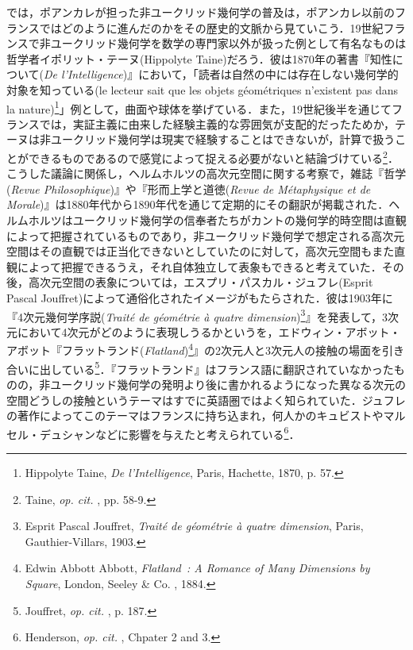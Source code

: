 では，ポアンカレが担った非ユークリッド幾何学の普及は，ポアンカレ以前のフランスではどのように進んだのかをその歴史的文脈から見ていこう．19世紀フランスで非ユークリッド幾何学を数学の専門家以外が扱った例として有名なものは哲学者イポリット・テーヌ(Hippolyte Taine)だろう．彼は1870年の著書『知性について(\emph{De l'Intelligence})』において，「読者は自然の中には存在しない幾何学的対象を知っている(le lecteur sait que les objets géométriques n'existent pas dans la nature)\footnote{Hippolyte Taine, \emph{De l'Intelligence}, Paris, Hachette, 1870, p. 57.}」例として，曲面や球体を挙げている．また，19世紀後半を通じてフランスでは，実証主義に由来した経験主義的な雰囲気が支配的だったためか，テーヌは非ユークリッド幾何学は現実で経験することはできないが，計算で扱うことができるものであるので感覚によって捉える必要がないと結論づけている\footnote{Taine, \emph{op. cit. }, pp. 58-9.}．こうした議論に関係し，ヘルムホルツの高次元空間に関する考察で，雑誌『哲学(\emph{Revue Philosophique})』や『形而上学と道徳(\emph{Revue  de Métaphysique et de Morale})』は1880年代から1890年代を通じて定期的にその翻訳が掲載された．ヘルムホルツはユークリッド幾何学の信奉者たちがカントの幾何学的時空間は直観によって把握されているものであり，非ユークリッド幾何学で想定される高次元空間はその直観では正当化できないとしていたのに対して，高次元空間もまた直観によって把握できるうえ，それ自体独立して表象もできると考えていた．その後，高次元空間の表象については，エスプリ・パスカル・ジュフレ(Esprit Pascal Jouffret)によって通俗化されたイメージがもたらされた．彼は1903年に『4次元幾何学序説(\emph{Traité de géométrie à quatre dimension})\footnote{Esprit Pascal Jouffret, \emph{Traité de géométrie à quatre dimension}, Paris, Gauthier-Villars, 1903.}』を発表して，3次元において4次元がどのように表現しうるかというを，エドウィン・アボット・アボット『フラットランド(\emph{Flatland})\footnote{Edwin Abbott Abbott, \emph{Flatland~: A Romance of Many Dimensions by Square}, London, Seeley \& Co. , 1884.}』の2次元人と3次元人の接触の場面を引き合いに出している\footnote{Jouffret, \emph{op. cit. }, p. 187.}．『フラットランド』はフランス語に翻訳されていなかったものの，非ユークリッド幾何学の発明より後に書かれるようになった異なる次元の空間どうしの接触というテーマはすでに英語圏ではよく知られていた．ジュフレの著作によってこのテーマはフランスに持ち込まれ，何人かのキュビストやマルセル・デュシャンなどに影響を与えたと考えられている\footnote{Henderson, \emph{op. cit. }, Chpater 2 and 3.}．

